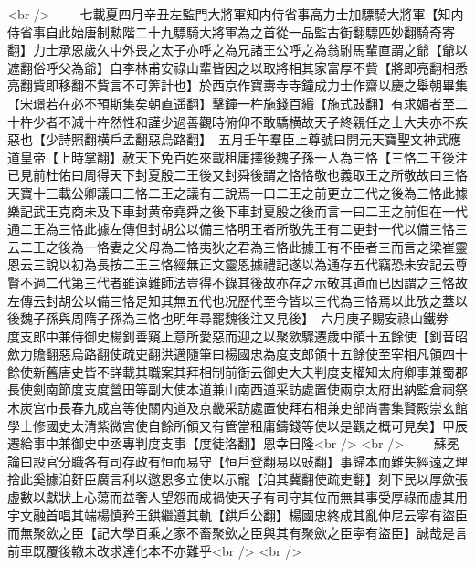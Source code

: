 <br />
　　七載夏四月辛丑左監門大將軍知内侍省事高力士加驃騎大將軍【知内侍省事自此始唐制勲階二十九驃騎大將軍為之首從一品監古衘翻驃匹妙翻騎奇寄翻】力士承恩歲久中外畏之太子亦呼之為兄諸王公呼之為翁駙馬輩直謂之爺【爺以遮翻俗呼父為爺】自李林甫安祿山輩皆因之以取將相其家富厚不貲【將即亮翻相悉亮翻貲即移翻不貲言不可筭計也】於西京作寶夀寺寺鐘成力士作齋以慶之舉朝畢集【宋璟若在必不預斯集矣朝直遥翻】擊鐘一杵施錢百緡【施式䜴翻】有求媚者至二十杵少者不減十杵然性和謹少過善觀時俯仰不敢驕横故天子終親任之士大夫亦不疾惡也【少詩照翻横戶孟翻惡烏路翻】　五月壬午羣臣上尊號曰開元天寶聖文神武應道皇帝【上時掌翻】赦天下免百姓來載租庸擇後魏子孫一人為三恪【三恪二王後注已見前杜佑曰周得天下封夏殷二王後又封舜後謂之恪恪敬也義取王之所敬故曰三恪天寶十三載公卿議曰三恪二王之議有三說焉一曰二王之前更立三代之後為三恪此據樂記武王克商未及下車封黄帝堯舜之後下車封夏殷之後而言一曰二王之前但在一代通二王為三恪此據左傳但封胡公以備三恪明王者所敬先王有二更封一代以備三恪三云二王之後為一恪妻之父母為二恪夷狄之君為三恪此據王有不臣者三而言之梁崔靈恩云三說以初為長按二王三恪經無正文靈恩據禮記遂以為通存五代竊恐未安記云尊賢不過二代第三代者雖遠難師法豈得不錄其後故亦存之示敬其道而已因謂之三恪故左傳云封胡公以備三恪足知其無五代也况歷代至今皆以三代為三恪焉以此攷之蓋以後魏子孫與周隋子孫為三恪也明年尋罷魏後注又見後】　六月庚子賜安祿山鐵劵　度支郎中兼侍御史楊釗善窺上意所愛惡而迎之以聚歛驟遷歲中領十五餘使【釗音昭歛力贍翻惡烏路翻使疏吏翻洪邁隨筆曰楊國忠為度支郎領十五餘使至宰相凡領四十餘使新舊唐史皆不詳載其職案其拜相制前衘云御史大夫判度支權知太府卿事兼蜀郡長使劍南節度支度營田等副大使本道兼山南西道采訪處置使兩京太府出納監倉祠祭木炭宫市長春九成宫等使關内道及京畿采訪處置使拜右相兼吏部尚書集賢殿崇玄館學士修國史太清紫微宫使自餘所領又有管當租庸鑄錢等使以是觀之概可見矣】甲辰遷給事中兼御史中丞專判度支事【度徒洛翻】恩幸日隆<br />
<br />
　　蘇冕論曰設官分職各有司存政有恒而易守【恒戶登翻易以䜴翻】事歸本而難失經遠之理捨此奚據洎姧臣廣言利以邀恩多立使以示寵【洎其冀翻使疏吏翻】刻下民以厚歛張虚數以獻狀上心蕩而益奢人望怨而成禍使天子有司守其位而無其事受厚祿而虚其用宇文融首唱其端楊慎矜王鉷繼遵其軌【鉷戶公翻】楊國忠終成其亂仲尼云寜有盜臣而無聚歛之臣【記大學百乘之家不畜聚歛之臣與其有聚歛之臣寜有盜臣】誠哉是言前車既覆後轍未改求達化本不亦難乎<br />
<br />
